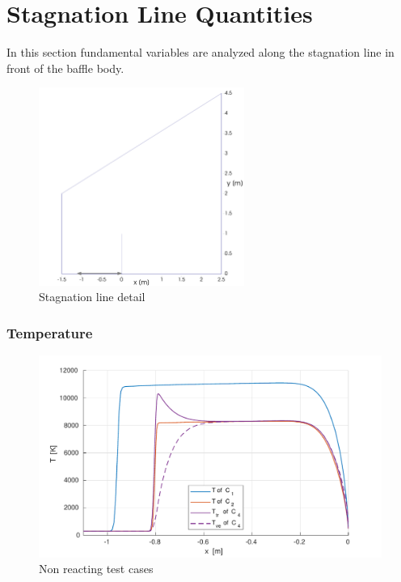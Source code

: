 \documentclass[10pt]{beamer}
\begin{document}
\section{Stagnation Line Quantities}

\begin{frame}
  In this section fundamental variables are analyzed along the stagnation line
  in front of the baffle body.
  \begin{figure}[ht]
    \centering \includegraphics[width=0.6\textwidth] {./figures/line.png}
	            \caption{Stagnation line detail}
  \end{figure}
\end{frame}

\begin{frame}
  \frametitle{Temperature}
  \begin{figure}[ht]
    \centering
    \includegraphics[width=\textwidth]{stagnationLine/figures/temperatureNReac.pdf}
    \caption{Non reacting test cases}
  \end{figure}
\end{frame}
\end{document}
